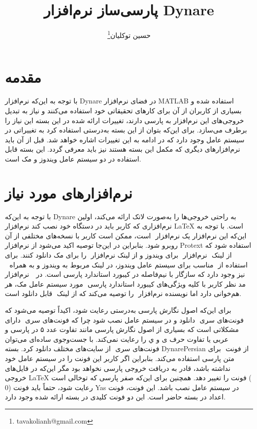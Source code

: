 \documentclass[12pt]{article}
\title{پارسی‌ساز نرم‌افزار Dynare}
\author{حسین توکلیان\thanks{tavakolianh@gmail.com} }%
\affil{عضو هیئت علمی دانشکده اقتصاد دانشگاه علامه طباطبائی}
\begin{document}
 
\maketitle

\section{مقدمه}
با توجه به این‌که نرم‌افزار Dynare در فضای نرم‌افزار MATLAB استفاده شده و بسیاری از کاربران از آن برای کارهای تحقیقاتی خود استفاده می‌کنند و نیاز به تبدیل خروجی‌های این نرم‌افزار به پارسی دارند، تغییرات ارائه شده در این بسته این نیاز را برطرف می‌سازد. برای این‌که بتوان از این بسته به‌درستی استفاده کرد به تغییراتی در سیستم عامل وجود دارد که در ادامه به این تغییرات اشاره خواهد شد. قبل از آن باید نرم‌افزارهای دیگری که مکمل این بسته هستند نیز باید معرفی گردد. این بسته قابل استفاده در دو سیستم عامل ویندوز و مک است. 
\section{نرم‌افزارهای مورد نیاز}
با توجه به این‌که Dynare به راحتی خروجی‌ها را به‌صورت لاتک ارائه می‌کند، اولین نرم‌افزاری که کاربر باید در دستگاه خود نصب کند نرم‌افزار ‪\LaTeX‬‬ است. با توجه به این‌که این نرم‌افزار یک نرم‌افزار ‪‬‬‬ است، ممکن است کاربر با نسخه‌های مختلفی از آن روبرو شود. بنابراین در این‌جا توصیه اکید می‌شود از نرم‌افزار Protext استفاده شود که از لینک ‪‬‬‬ نرم‌افزار ‪‬‬ برای ویندوز و از لینک ‪‬‬‬ نرم‌افزار ‪‬‬‬ را برای مک دانلود کنند. برای استفاده از ‪‬‬‬ مناسب برای سیستم عامل ویندوز، در لینک مربوط به ویندوز و به همراه ‪‬‬ ‬‬ نرم‌افزار ‪‬‬ ‬‬‪  نیز وجود دارد که سازگار با نیم‌فاصله در کیبورد استاندارد پارسی است. در مورد سیستم عامل مک، هر ‪‬‬ ‬‬‬مد نظر کاربر با کلیه ویژگی‌های کیبورد استاندارد پارسی هم‌خوانی دارد اما نویسنده نرم‌افزار ‪‬‬ ‬‬‬را توصیه می‌کند که از لینک ‪‬‬‬ قابل دانلود است.

برای این‌که اصول نگارش پارسی به‌درستی رعایت شود، اکیداً توصیه می‌شود که فونت‌های سری ‪‬‬ دانلود و در سیستم‌ عامل نصب شود چرا که فونت‌های سری ‪‬‬ دارای مشکلاتی است که بسیاری از اصول نگارش پارسی مانند تفاوت عدد ۵ در پارسی و عربی یا تفاوت حرف ی و ي را رعایت نمی‌کند. با جست‌وجوی ساده‌ای می‌توان فونت‌های سری ‪‬‬ از سایت‌های مختلف دانلود کرد. بسته DynarePersian از فونت ‪‬‬‬ برای متن پارسی استفاده می‌کند. بنابراین اگر کاربر این فونت را در سیستم عامل خود نداشته باشد، قادر به دریافت خروجی پارسی نخواهد بود مگر این‌که در فایل‌های خروجی ‪\LaTeX‬‬‬ فونت را تغییر دهد. همچنین برای این‌که صفر پارسی که توخالی است (‪$0$‬‬‬‬) رعایت شود، حتماً باید فونت Yas در سیستم عامل نصب باشد. این فونت، فونت اعداد در بسته حاضر است. این دو فونت کلیدی در بسته ارائه شده وجود دارد.
\end{document}
